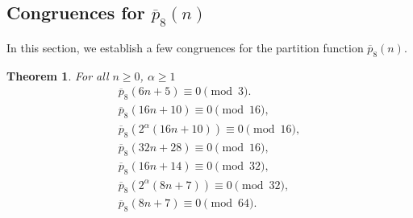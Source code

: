 \documentclass[11pt, reqno]{amsart}
\newtheorem{theorem}{Theorem}[section]
\numberwithin{equation}{section}
\begin{document}
	\subsection{Congruences for $\overline{p}_{8}(n)$}
	In this section, we establish a few congruences for the partition function $\overline{p}_{8}(n)$.
	\begin{theorem}\label{61}For all $n\geq0$, $\alpha\geq1$
		\begin{align}
			\overline{p}_{8}(6n+5)\equiv0\pmod{3}.\label{res81}\\
			\overline{p}_{8}(16n+10)\equiv0\pmod{16},\label{res82}\\
			\overline{p}_{8}(2^{\alpha}(16n+10))\equiv0\pmod{16},\label{res83}\\
			\overline{p}_{8}(32n+28)\equiv0\pmod{16},\label{res84}\\
			\overline{p}_{8}(16n+14)\equiv0\pmod{32},\label{res85}\\
			\overline{p}_{8}(2^\alpha(8n+7))\equiv0\pmod{32},\label{res86}\\
			\overline{p}_{8}(8n+7)\equiv0\pmod{64}.\label{res87}
		\end{align}
	\end{theorem}
\end{document}
